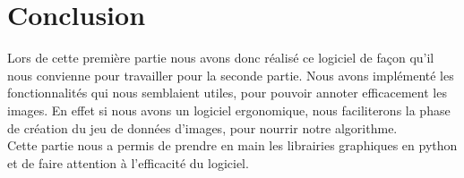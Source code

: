 \documentclass[a4paper,12pt]{article}
\begin{document}
\section{Conclusion}

Lors de cette première partie nous avons donc réalisé ce logiciel de façon qu’il nous convienne pour travailler pour la seconde partie. Nous avons implémenté les fonctionnalités qui nous semblaient utiles, pour pouvoir annoter efficacement les images. En effet si nous avons un logiciel ergonomique, nous faciliterons la phase de création du jeu de données d'images, pour nourrir notre algorithme. \\

Cette partie nous a permis de prendre en main les librairies graphiques en python et de faire attention à l'efficacité du logiciel.
\end{document}
